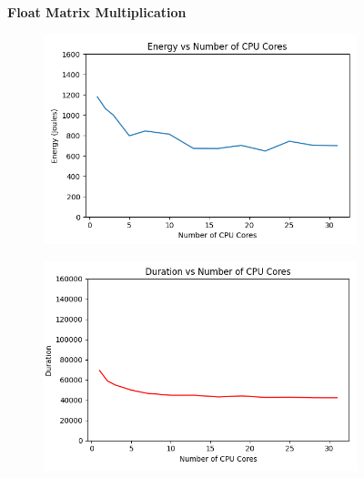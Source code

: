 \documentclass[times, 10pt,twocolumn]{article}
\begin{document}
\begin{figure}[ht]
   \centering
   \textbf{Float Matrix Multiplication}\par\medskip
   \begin{subfigure}[b]{0.3\textwidth}
     \includegraphics[width=\textwidth]{imgs/study_1_results/var_cpu/floatmatmul/CPU_Energy.png}
     \caption{}
     \label{fig:plot1}
   \end{subfigure}
   \hfill
   \begin{subfigure}[b]{0.3\textwidth}
      \includegraphics[width=\textwidth]{imgs/study_1_results/var_cpu/floatmatmul/CPU_Duration.png}
     \caption{}
     \label{fig:plot2}
   \end{subfigure}
   \hfill
   \begin{subfigure}[b]{0.3\textwidth}

\end{subfigure}
\end{figure}
\end{document}
